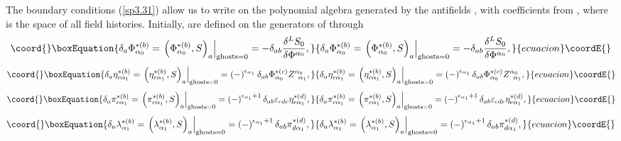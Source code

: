 \documentclass[a4paper,12pt]{article}
\begin{document}
The boundary conditions (\ref{sp3.31}) allow us to write \coordHE{} on the polynomial algebra \coordHE{} generated by the antifields \coordHE{},
with coefficients from \coordHE{}, where \coordHE{} is the space
of all field histories. Initially, \coordHE{}
are defined on the generators of \coordHE{} through 
\begin{equation}\coord{}\boxEquation{
\delta _{a}\Phi _{\alpha _{0}}^{*(b)}=\left. \left( \Phi _{\alpha
_{0}}^{*(b)},S\right) _{a}\right| _{\mathrm{ghosts}=0}=-\delta _{ab}\frac{
\delta ^{L}S_{0}}{\delta \Phi ^{\alpha _{0}}},  \label{sp3.32}
}{
\delta _{a}\Phi _{\alpha _{0}}^{*(b)}=\left. \left( \Phi _{\alpha
_{0}}^{*(b)},S\right) _{a}\right| _{\mathrm{ghosts}=0}=-\delta _{ab}\frac{
\delta ^{L}S_{0}}{\delta \Phi ^{\alpha _{0}}},  }{ecuacion}\coordE{}\end{equation}
\begin{equation}\coord{}\boxEquation{
\delta _{a}\eta _{c\alpha _{1}}^{*(b)}=\left. \left( \eta _{c\alpha
_{1}}^{*(b)},S\right) _{a}\right| _{\mathrm{ghosts}=0}=\left( -\right)
^{\epsilon _{\alpha _{1}}}\delta _{ab}\Phi _{\alpha
_{0}}^{*(c)}Z_{\;\;\alpha _{1}}^{\alpha _{0}},  \label{sp3.33}
}{
\delta _{a}\eta _{c\alpha _{1}}^{*(b)}=\left. \left( \eta _{c\alpha
_{1}}^{*(b)},S\right) _{a}\right| _{\mathrm{ghosts}=0}=\left( -\right)
^{\epsilon _{\alpha _{1}}}\delta _{ab}\Phi _{\alpha
_{0}}^{*(c)}Z_{\;\;\alpha _{1}}^{\alpha _{0}},  }{ecuacion}\coordE{}\end{equation}
\begin{equation}\coord{}\boxEquation{
\delta _{a}\pi _{c\alpha _{1}}^{*(b)}=\left. \left( \pi _{c\alpha
_{1}}^{*(b)},S\right) _{a}\right| _{\mathrm{ghosts}=0}=\left( -\right)
^{\epsilon _{\alpha _{1}}+1}\delta _{ab}\varepsilon _{cde}\eta _{e\alpha
_{1}}^{*(d)},  \label{sp3.34}
}{
\delta _{a}\pi _{c\alpha _{1}}^{*(b)}=\left. \left( \pi _{c\alpha
_{1}}^{*(b)},S\right) _{a}\right| _{\mathrm{ghosts}=0}=\left( -\right)
^{\epsilon _{\alpha _{1}}+1}\delta _{ab}\varepsilon _{cde}\eta _{e\alpha
_{1}}^{*(d)},  }{ecuacion}\coordE{}\end{equation}
\begin{equation}\coord{}\boxEquation{
\delta _{a}\lambda _{\alpha _{1}}^{*(b)}=\left. \left( \lambda _{\alpha
_{1}}^{*(b)},S\right) _{a}\right| _{\mathrm{ghosts}=0}=\left( -\right)
^{\epsilon _{\alpha _{1}}+1}\delta _{ab}\pi _{d\alpha _{1}}^{*(d)},
\label{sp3.35}
}{
\delta _{a}\lambda _{\alpha _{1}}^{*(b)}=\left. \left( \lambda _{\alpha
_{1}}^{*(b)},S\right) _{a}\right| _{\mathrm{ghosts}=0}=\left( -\right)
^{\epsilon _{\alpha _{1}}+1}\delta _{ab}\pi _{d\alpha _{1}}^{*(d)},
}{ecuacion}\coordE{}\end{equation}
\end{document}
